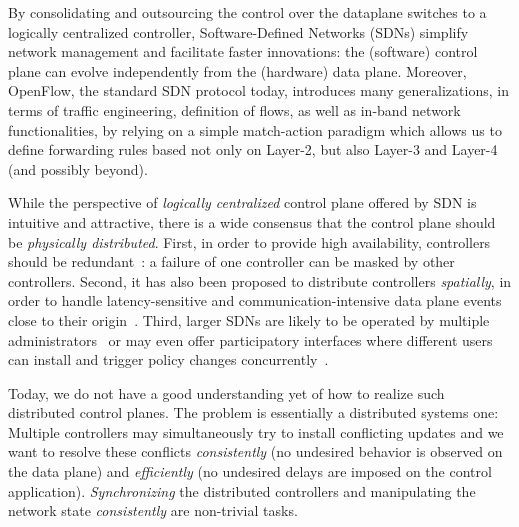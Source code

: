 \documentclass[conference]{sigcomm-alternate}
\begin{document}
By consolidating and outsourcing the control over the dataplane switches to a logically
centralized controller, Software-Defined Networks (SDNs)
simplify network management and facilitate faster innovations:
the (software) control plane can evolve independently from the
(hardware) data plane.
Moreover, OpenFlow, the standard SDN protocol today, introduces many generalizations,
in terms of traffic engineering, definition of flows, as well as in-band network functionalities,
by relying on a simple match-action paradigm which allows us to define
forwarding rules based not only on Layer-2, but also Layer-3 and Layer-4 (and possibly beyond).

While the perspective of \emph{logically centralized} control plane
offered by SDN is intuitive and attractive,
there is a wide consensus that
the control plane should be  \emph{physically distributed}.
First, in order to provide high availability,
controllers should be redundant~\cite{onix,onos,elasticon}: a failure 
of one controller can be masked by other controllers.
Second, it has also been proposed to distribute controllers \emph{spatially}, in order to handle latency-sensitive and
communication-intensive
data plane
events close to their origin~\cite{devoflow,kandoo}.
Third, larger SDNs are likely to be operated by multiple administrators~\cite{stn} or may even offer
participatory interfaces where different users can install and trigger policy changes
concurrently~\cite{participatory}.


Today, we do not have a good understanding yet of how to realize
such distributed control planes. The problem is essentially a
distributed systems
one: Multiple controllers may simultaneously try to
install conflicting updates and we want to resolve these conflicts
\emph{consistently} (no undesired behavior is observed on the data
plane) and \emph{efficiently} (no undesired delays are imposed on the
control application).
\emph{Synchronizing}
the distributed controllers and manipulating the network state \emph{consistently}
are non-trivial tasks.~\cite{sharon}
\end{document}

